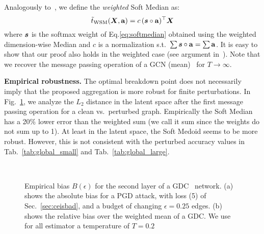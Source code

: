 \documentclass[sigconf, review]{acmart}
\newcommand{\features}{\mX}
\newcommand{\softout}{\vs}
\begin{document}
Analogously to~\citet{Geisler2020}, we define the \emph{weighted} Soft Median as:
\begin{equation}\label{eq:resulting-wsm}
  \tilde{t}_{\text{WSM}}(\features, \mathbf{a}) = c\,(\softout \circ \mathbf{a})^\top\features
\end{equation}
where \(\softout\) is the softmax weight of Eq.\ref{eq:softmedian} obtained using the weighted dimension-wise Median and \(c\) is a normalization s.t.\ \(\sum \softout \circ \mathbf{a} = \sum \mathbf{a}\). It is easy to show that our proof also holds in the weighted case (see argument in~\citep{Geisler2020}). Note that we recover the message passing operation of a GCN (mean)~\cite{Kipf2017} for \(T \to \infty\).

\textbf{Empirical robustness.} The optimal breakdown point does not necessarily imply that the proposed aggregation is more robust for finite perturbations. In Fig.~\ref{fig:empbiascurve}, we analyze the \(L_2\) distance in the latent space after the first message passing operation for a clean vs.\ perturbed graph. Empirically the Soft Median has a 20\% lower error than the weighted sum (we call it sum since the weights do not sum up to 1). At least in the latent space, the Soft Medoid seems to be more robust. However, this is not consistent with the perturbed accuracy values in Tab.~\ref{tab:global_small} and Tab.~\ref{tab:global_large}.


\begin{figure}
  \centering
  \hbox{\hspace{15pt} \resizebox{0.9\linewidth}{!}{}}
  \vspace{-14pt}
  \caption{Empirical bias \(B(\epsilon)\) for the second layer of a GDC~\citep{Klicpera2019a} network. (a) shows the absolute bias for a PGD attack, with loss (5) of Sec.~\ref{sec:ceisbad}, and a budget of changing \(\epsilon=0.25\) edges. (b) shows the relative bias over the weighted mean of a GDC. We use for all estimator a temperature of \(T=0.2\)\label{fig:empbiascurve}}
\end{figure}
\end{document}

